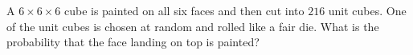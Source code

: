 A $6\times6\times6$ cube is painted on all six faces and then cut into $216$ unit cubes. One of the unit cubes is chosen at random and rolled like a fair die. What is the probability that the face landing on top is painted?
